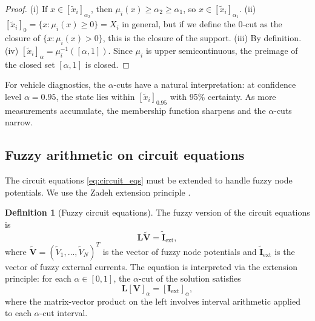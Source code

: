 \documentclass[twocolumn,10pt,a4paper]{article}
\theoremstyle{definition}
\newtheorem{definition}[theorem]{Definition}
\theoremstyle{remark}
\newcommand{\vect}[1]{\boldsymbol{#1}}
\newcommand{\mat}[1]{\mathbf{#1}}
\newcommand{\fuzzy}[1]{\widetilde{#1}}
\begin{document}
\begin{proof}
(i) If $x \in [\fuzzy{x}_i]_{\alpha_2}$, then $\mu_i(x) \geq \alpha_2 \geq \alpha_1$, so $x \in [\fuzzy{x}_i]_{\alpha_1}$.
(ii) $[\fuzzy{x}_i]_0 = \{x : \mu_i(x) \geq 0\} = X_i$ in general, but if we define the $0$-cut as the closure of $\{x : \mu_i(x) > 0\}$, this is the closure of the support.
(iii) By definition.
(iv) $[\fuzzy{x}_i]_\alpha = \mu_i^{-1}([\alpha, 1])$. Since $\mu_i$ is upper semicontinuous, the preimage of the closed set $[\alpha, 1]$ is closed.
\end{proof}

For vehicle diagnostics, the $\alpha$-cuts have a natural interpretation: at confidence level $\alpha = 0.95$, the state lies within $[\fuzzy{x}_i]_{0.95}$ with 95\% certainty. As more measurements accumulate, the membership function sharpens and the $\alpha$-cuts narrow.

\subsection{Fuzzy arithmetic on circuit equations}

The circuit equations \eqref{eq:circuit_eqs} must be extended to handle fuzzy node potentials. We use the Zadeh extension principle \citep{Zadeh1965, Klir1995}.

\begin{definition}[Fuzzy circuit equations]\label{def:fuzzy_circuit}
The fuzzy version of the circuit equations is
\begin{equation}\label{eq:fuzzy_circuit}
\mat{L} \fuzzy{\vect{V}} = \fuzzy{\vect{I}}_{\mathrm{ext}},
\end{equation}
where $\fuzzy{\vect{V}} = (\fuzzy{V}_1, \ldots, \fuzzy{V}_N)^T$ is the vector of fuzzy node potentials and $\fuzzy{\vect{I}}_{\mathrm{ext}}$ is the vector of fuzzy external currents. The equation is interpreted via the extension principle: for each $\alpha \in [0, 1]$, the $\alpha$-cut of the solution satisfies
\begin{equation}\label{eq:fuzzy_alpha_circuit}
\mat{L} [\vect{V}]_\alpha = [\vect{I}_{\mathrm{ext}}]_\alpha,
\end{equation}
where the matrix-vector product on the left involves interval arithmetic applied to each $\alpha$-cut interval.
\end{definition}
\end{document}

